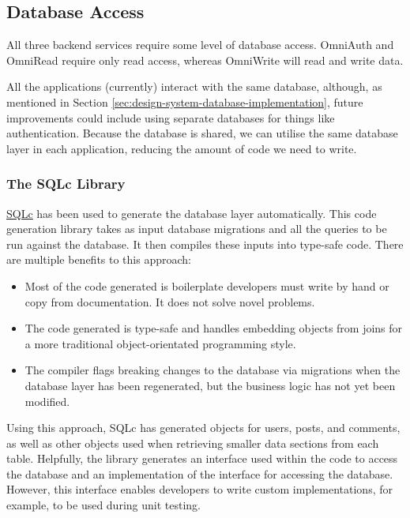 \subsection{Database Access}
\label{sec:impl-backend-db}
All three backend services require some level of database access. OmniAuth and OmniRead require only read access, whereas OmniWrite will read and write data. 

All the applications (currently) interact with the same database, although, as mentioned in Section \ref{sec:design-system-database-implementation}, future improvements could include using separate databases for things like authentication.
Because the database is shared, we can utilise the same database layer in each application, reducing the amount of code we need to write.

\subsubsection{The SQLc Library}
\underline{\href{https://sqlc.dev}{SQLc}} \nocite{sqlc} has been used to generate the database layer automatically.
This code generation library takes as input database migrations and all the queries to be run against the database.
It then compiles these inputs into type-safe code. There are multiple benefits to this approach:
\begin{itemize}
    \item Most of the code generated is boilerplate developers must write by hand or copy from documentation. It does not solve novel problems.
    \item The code generated is type-safe and handles embedding objects from joins for a more traditional object-orientated programming style. 
    \item The compiler flags breaking changes to the database via migrations when the database layer has been regenerated, but the business logic has not yet been modified.
\end{itemize}
Using this approach, SQLc has generated objects for users, posts, and comments, as well as other objects used when retrieving smaller data sections from each table.
Helpfully, the library generates an interface used within the code to access the database and an implementation of the interface for accessing the database.
However, this interface enables developers to write custom implementations, for example, to be used during unit testing. 



